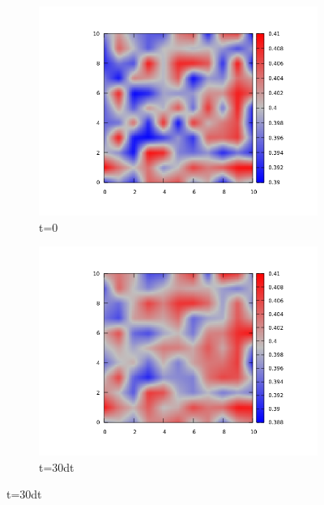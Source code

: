 \documentclass{article}
\begin{document}
\vfill
\clearpage
\newpage
\begin{figure}
\centering
\begin{subfigure}{.5\textwidth}
  \centering
  \includegraphics[width=1.0\linewidth]{initialper.png}
  \caption{t=0}
  \label{fig:sub1}
\end{subfigure}%
\begin{subfigure}{.5\textwidth}
  \centering
  \includegraphics[width=1.0\linewidth]{30per.png}
  \caption{t=30dt}
  \label{fig:sub2}
\end{subfigure}
\label{fig:test}
\end{figure}
\end{document}
